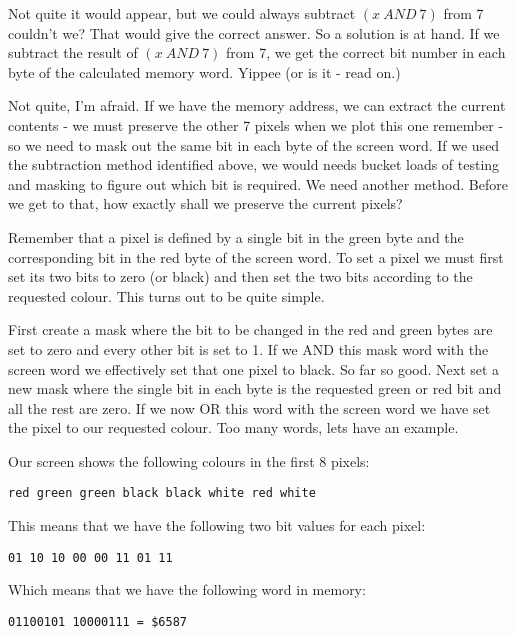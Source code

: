 Not quite it would appear, but we could always subtract $(x~AND~7)$
    from 7 couldn't we? That would give the correct answer. So a solution is
    at hand. If we subtract the result of $(x~AND~7)$ from 7, we get the correct
    bit number in each byte of the calculated memory word. Yippee (or is it -{}
    read on.)

Not quite, I'm afraid. If we have the memory address, we can extract
    the current contents -{} we must preserve the other 7 pixels when we plot
    this one remember -{} so we need to mask out the same bit in each byte of
    the screen word. If we used the subtraction method identified above, we
    would needs bucket loads of testing and masking to figure out which bit is
    required. We need another method. Before we get to that, how exactly shall
    we preserve the current pixels?

Remember that a pixel is defined by a single bit in the green byte
    and the corresponding bit in the red byte of the screen word. To set a
    pixel we must first set its two bits to zero (or black) and then set the
    two bits according to the requested colour. This turns out to be quite
    simple.

First create a mask where the bit to be changed in the red and green
    bytes are set to zero and every other bit is set to 1. If we AND this mask
    word with the screen word we effectively set that one pixel to black. So
    far so good. Next set a new mask where the single bit in each byte is the
    requested green or red bit and all the rest are zero. If we now OR this
    word with the screen word we have set the pixel to our requested colour.
    Too many words, lets have an example.

Our screen shows the following colours in the first 8 pixels:

\begin{lstlisting}[frame=none,numbers=none]
red green green black black white red white
\end{lstlisting}

This means that we have the following two bit values for each pixel:

\begin{lstlisting}[firstnumber=1,frame=none,numbers=none]
01 10 10 00 00 11 01 11
\end{lstlisting}

Which means that we have the following word in memory:

\begin{lstlisting}[firstnumber=1,frame=none,numbers=none]
01100101 10000111 = $6587
\end{lstlisting}

